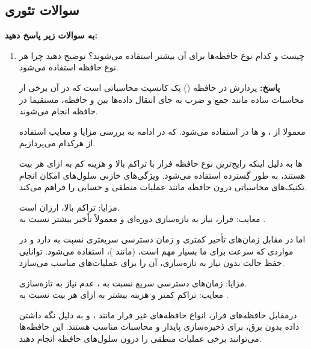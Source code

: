 \documentclass[12pt]{exam}
\newcommand{\class}{\ThesisClass}
\begin{document}

\pagestyle{empty}


\pagestyle{head}
\firstpageheader{}{}{}
\runningheader{صفحه \thepage\ از \numpages}{}{\class}
\runningheadrule

\vspace{0pt}


\begin{questions}
	
	\section*{سوالات تئوری}
	\question
\textbf{به سوالات زیر پاسخ دهید:‌ }

\begin{enumerate}
	\item 
	 چیست و کدام نوع حافظه‌ها برای آن بیشتر استفاده می‌شوند؟ توضیح دهید چرا هر نوع حافظه استفاده می‌شود.
	
	\textbf{پاسخ: }
پردازش در حافظه () یک کانسپت محاسباتی است که در آن برخی از محاسبات ساده مانند جمع و ضرب به جای انتقال داده‌ها بین  و حافظه، مستقیما در حافظه انجام می‌شوند.

معمولا از ،  و  ها در  استفاده می‌شود. که در ادامه به بررسی مزایا و معایب استفاده از هرکدام می‌پردازیم.

 ها
به دلیل اینکه رایج‌ترین نوع حافظه فرار با تراکم بالا و هزینه کم به ازای هر بیت هستند، به طور گسترده استفاده می‌شود. ویژگی‌های خازنی سلول‌های  امکان انجام تکنیک‌های محاسباتی درون حافظه مانند عملیات منطقی و حسابی را فراهم می‌کند.

مزایا: تراکم بالا، ارزان است.\\
معایب: فرار، نیاز به تازه‌سازی دوره‌ای و معمولاً تأخیر بیشتر نسبت به .

اما در مقابل   زمان‌های تأخیر کمتری و زمان دسترسی سریعتری نسبت به  دارد و در مواردی که سرعت برای ما بسیار مهم است، (مانند )، استفاده می‌شود. توانایی حفظ حالت بدون نیاز به تازه‌سازی، آن را برای عملیات‌های  مناسب می‌سازد.

مزایا: زمان‌های دسترسی سریع نسبت به ، عدم نیاز به تازه‌سازی.\\
معایب: تراکم کمتر و هزینه بیشتر به ازای هر بیت نسبت به .


درمقابل حافظه‌های فرار، انواع حافظه‌های غیر فرار مانند ،  و  به دلیل نگه داشتن داده بدون برق، برای ذخیره‌سازی پایدار و محاسبات مناسب هستند. این حافظه‌ها می‌توانند برخی عملیات منطقی را درون سلول‌های حافظه انجام دهند.


\end{enumerate}
\end{questions}
\end{document}
